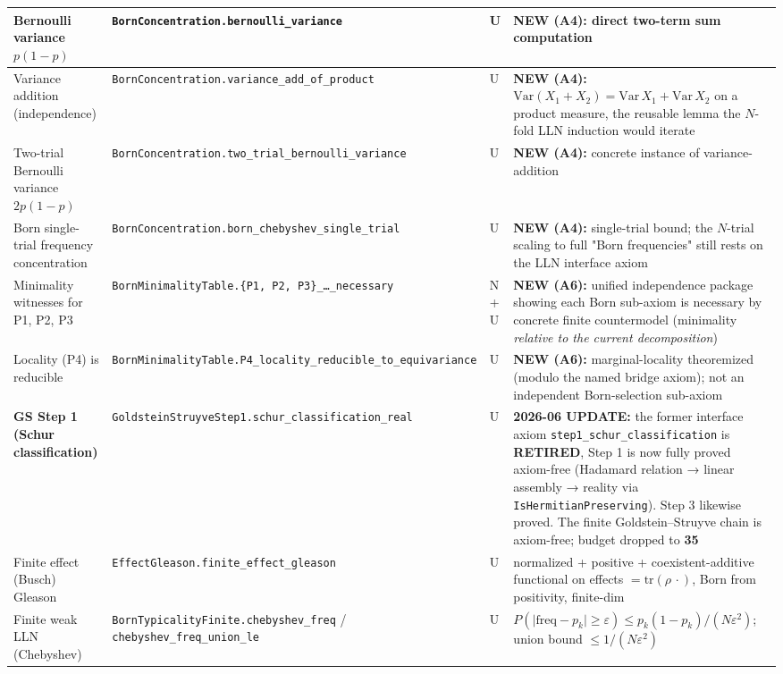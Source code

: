 \documentclass[11pt,a4paper]{article}
\begin{document}
\begin{center}
\begin{tabularx}{\linewidth}{|Y|Y|Y|Y|}
\hline
Bernoulli variance $p(1-p)$ & \texttt{BornConcentration.bernoulli\_variance} & U & \textbf{NEW (A4):} direct two-term sum computation \\
\hline
Variance addition (independence) & \texttt{BornConcentration.variance\_add\_of\_product} & U & \textbf{NEW (A4):} $\mathrm{Var}(X_1+X_2)=\mathrm{Var}\,X_1+\mathrm{Var}\,X_2$ on a product measure, the reusable lemma the $N$-fold LLN induction would iterate \\
\hline
Two-trial Bernoulli variance $2p(1-p)$ & \texttt{BornConcentration.two\_trial\_bernoulli\_variance} & U & \textbf{NEW (A4):} concrete instance of variance-addition \\
\hline
Born single-trial frequency concentration & \texttt{BornConcentration.born\_chebyshev\_single\_trial} & U & \textbf{NEW (A4):} single-trial bound; the $N$-trial scaling to full "Born frequencies" still rests on the LLN interface axiom \\
\hline
Minimality witnesses for P1, P2, P3 & \texttt{BornMinimalityTable.\{P1, P2, P3\}\_…\_necessary} & N + U & \textbf{NEW (A6):} unified independence package showing each Born sub-axiom is necessary by concrete finite countermodel (minimality \emph{relative to the current decomposition}) \\
\hline
Locality (P4) is reducible & \texttt{BornMinimalityTable.P4\_locality\_reducible\_to\_equivariance} & U & \textbf{NEW (A6):} marginal-locality theoremized (modulo the named bridge axiom); not an independent Born-selection sub-axiom \\
\hline
\textbf{GS Step 1 (Schur classification)} & \texttt{GoldsteinStruyveStep1.schur\_classification\_real} & U & \textbf{2026-06 UPDATE:} the former interface axiom \texttt{step1\_schur\_classification} is \textbf{RETIRED}, Step 1 is now fully proved axiom-free (Hadamard relation → linear assembly → reality via \texttt{IsHermitianPreserving}). Step 3 likewise proved. The finite Goldstein–Struyve chain is axiom-free; budget dropped to \textbf{35} \\
\hline
Finite effect (Busch) Gleason & \texttt{EffectGleason.finite\_effect\_gleason} & U & normalized + positive + coexistent-additive functional on effects $=\mathrm{tr}(\rho\,\cdot)$, Born from positivity, finite-dim \\
\hline
Finite weak LLN (Chebyshev) & \texttt{BornTypicalityFinite.chebyshev\_freq} / \texttt{chebyshev\_freq\_union\_le} & U & $P(\lvert\mathrm{freq}-p_k\rvert\ge\varepsilon)\le p_k(1-p_k)/(N\varepsilon^2)$; union bound $\le 1/(N\varepsilon^2)$ \\

\end{tabularx}
\end{center}
\end{document}
